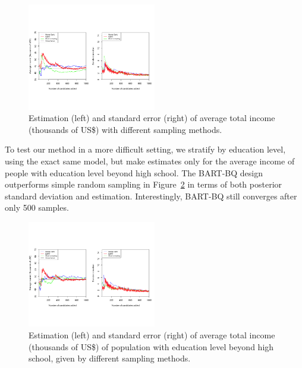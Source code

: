 \begin{figure}[tbh!]
    \centering
    \vspace*{-0.8in}
    \includegraphics[width = 0.50\textwidth]{report/Writing/6.Real_Data_Sets/population.png}
    \vspace*{-0.5in}
    \caption{Estimation (left) and standard error (right) of average total income (thousands of US\$) with different sampling methods.}
    \label{fig:poptMean}
\end{figure}

To test our method in a more difficult setting, we stratify by education level, using the exact same model, but make estimates only for the average income of people with education level beyond high school. The BART-BQ design outperforms simple random sampling in Figure~\ref{fig:high+} in terms of both posterior standard deviation and estimation. Interestingly, BART-BQ still converges after only 500 samples.

\begin{figure}[tbh!]
    \centering
    \includegraphics[width = 0.50\textwidth]{report/Writing/6.Real_Data_Sets/high+.png}
    \vspace*{-0.8in}
    \caption{Estimation (left) and standard error (right) of average total income (thousands of US\$) of population with education level beyond high school, given by different sampling methods.}
    \label{fig:high+}
\end{figure}

